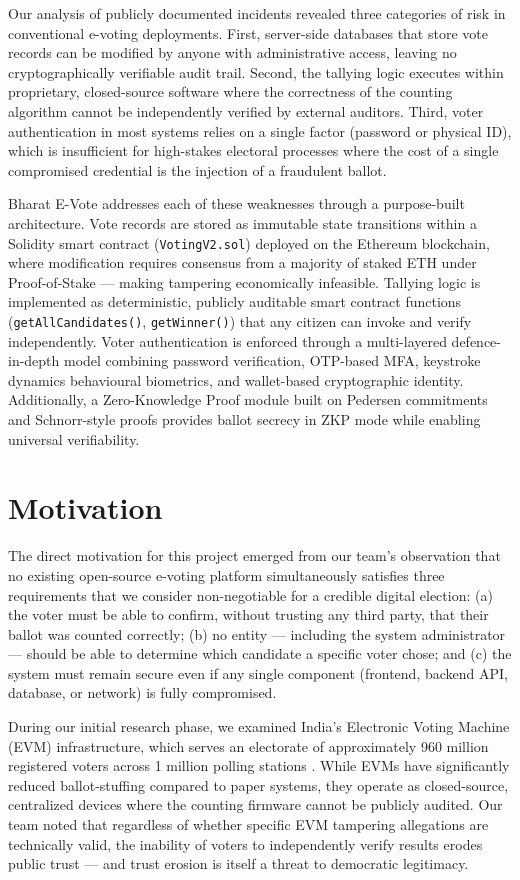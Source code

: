 \documentclass[oneside,a4paper,12pt]{book}
\begin{document}
Our analysis of publicly documented incidents revealed three categories of risk in conventional e-voting deployments. First, server-side databases that store vote records can be modified by anyone with administrative access, leaving no cryptographically verifiable audit trail. Second, the tallying logic executes within proprietary, closed-source software where the correctness of the counting algorithm cannot be independently verified by external auditors. Third, voter authentication in most systems relies on a single factor (password or physical ID), which is insufficient for high-stakes electoral processes where the cost of a single compromised credential is the injection of a fraudulent ballot.

Bharat E-Vote addresses each of these weaknesses through a purpose-built architecture. Vote records are stored as immutable state transitions within a Solidity smart contract (\texttt{VotingV2.sol}) deployed on the Ethereum blockchain, where modification requires consensus from a majority of staked ETH under Proof-of-Stake --- making tampering economically infeasible. Tallying logic is implemented as deterministic, publicly auditable smart contract functions (\texttt{getAllCandidates()}, \texttt{getWinner()}) that any citizen can invoke and verify independently. Voter authentication is enforced through a multi-layered defence-in-depth model combining password verification, OTP-based MFA, keystroke dynamics behavioural biometrics, and wallet-based cryptographic identity. Additionally, a Zero-Knowledge Proof module built on Pedersen commitments and Schnorr-style proofs provides ballot secrecy in ZKP mode while enabling universal verifiability.

\section{Motivation}
The direct motivation for this project emerged from our team's observation that no existing open-source e-voting platform simultaneously satisfies three requirements that we consider non-negotiable for a credible digital election: (a) the voter must be able to confirm, without trusting any third party, that their ballot was counted correctly; (b) no entity --- including the system administrator --- should be able to determine which candidate a specific voter chose; and (c) the system must remain secure even if any single component (frontend, backend API, database, or network) is fully compromised.

During our initial research phase, we examined India's Electronic Voting Machine (EVM) infrastructure, which serves an electorate of approximately 960 million registered voters across 1 million polling stations \cite{eci2024}. While EVMs have significantly reduced ballot-stuffing compared to paper systems, they operate as closed-source, centralized devices where the counting firmware cannot be publicly audited. Our team noted that regardless of whether specific EVM tampering allegations are technically valid, the inability of voters to independently verify results erodes public trust --- and trust erosion is itself a threat to democratic legitimacy.
\end{document}
